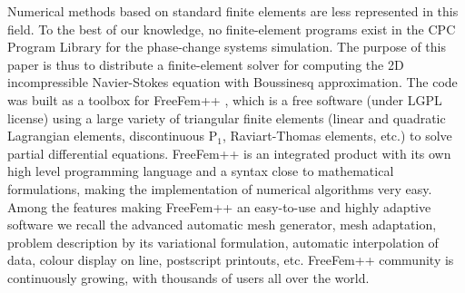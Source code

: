  Numerical methods based on standard finite elements are less represented in this field. To the best of our knowledge, no finite-element programs exist in the CPC Program Library for the phase-change systems simulation. The purpose of this paper is thus to distribute a finite-element solver for computing the 2D incompressible Navier-Stokes equation with Boussinesq approximation.
 The code was built as a toolbox for FreeFem++ \citep{hecht-2012-JNM,freefem}, which is a free software (under LGPL license) using a large variety of triangular finite elements  (linear and quadratic Lagrangian elements, discontinuous P$_1$, Raviart-Thomas elements, etc.)  to solve partial differential equations. FreeFem++ is an integrated product with its own high level programming language and a syntax close to mathematical formulations, making the implementation of numerical algorithms very easy. Among the features making FreeFem++ an easy-to-use and highly adaptive  software we recall the advanced automatic mesh generator, mesh adaptation, problem description by its variational formulation, automatic interpolation of data, colour display on line, postscript printouts, etc. FreeFem++ community is continuously growing, with  thousands of users all over the world.

